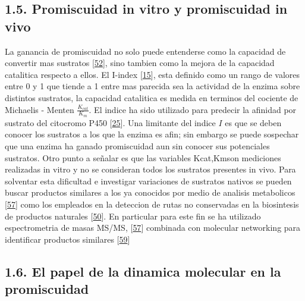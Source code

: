 \documentclass[12pt,twoside]{reedthesis}
\begin{document}
  \subsection{1.5. Promiscuidad in vitro y promiscuidad in
  vivo}\label{promiscuidad-in-vitro-y-promiscuidad-in-vivo}
  
  La ganancia de promiscuidad no solo puede entenderse como la capacidad
  de convertir mas sustratos
  {[}\protect\hyperlink{ref-carbonellux5fmolecularux5f2010}{52}{]}, sino
  tambien como la mejora de la capacidad catalitica respecto a ellos. El
  I-index {[}\protect\hyperlink{ref-nathux5fquantitativeux5f2008}{15}{]},
  esta definido como un rango de valores entre 0 y 1 que tiende a 1 entre
  mas parecida sea la actividad de la enzima sobre distintos sustratos, la
  capacidad catalitica es medida en terminos del cociente de Michaelis -
  Menten \(\frac{K_{cat}}{K_m}\). El indice ha sido utilizado para
  predecir la afinidad por sustrato del citocromo P450
  {[}\protect\hyperlink{ref-nathux5fquantifyingux5f2010}{25}{]}. Una
  limitante del indice \(I\) es que se deben conocer los sustratos a los
  que la enzima es afin; sin embargo se puede sospechar que una enzima ha
  ganado promiscuidad aun sin conocer sus potenciales sustratos. Otro
  punto a señalar es que las variables Kcat,Kmson mediciones realizadas in
  vitro y no se consideran todos los sustratos presentes in vivo. Para
  solventar esta dificultad e investigar variaciones de sustratos nativos
  se pueden buscar productos similares a los ya conocidos por medio de
  analisis metabolicos
  {[}\protect\hyperlink{ref-nesvizhskiiux5fanalysisux5f2007}{57}{]} como
  los empleados en la deteccion de rutas no conservadas en la biosintesis
  de productos naturales
  {[}\protect\hyperlink{ref-medemaux5fcomputationalux5f2015}{50}{]}. En
  particular para este fin se ha utilizado espectrometria de masas MS/MS,
  {[}\protect\hyperlink{ref-nesvizhskiiux5fanalysisux5f2007}{57}{]}
  combinada con molecular networking para identificar productos similares
  {[}\protect\hyperlink{ref-yangux5fmolecularux5f2013}{59}{]}
  
  \subsection{1.6. El papel de la dinamica molecular en la
  promiscuidad}\label{el-papel-de-la-dinamica-molecular-en-la-promiscuidad}
  
\end{document}

